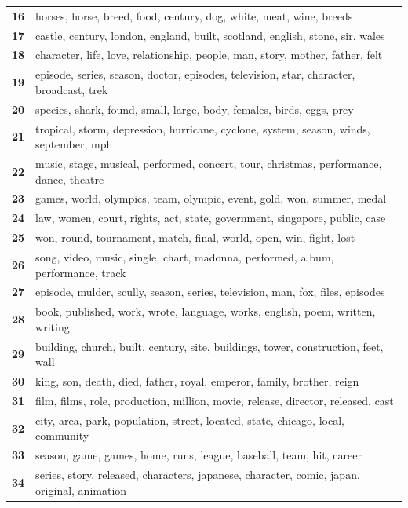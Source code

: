 \begin{table}[htpb]
\begin{tabularx}{\textwidth}{@{}l X@{}}
        \textbf{16} & horses, horse, breed, food, century, dog, white, meat, wine, breeds \\
        \textbf{17} & castle, century, london, england, built, scotland, english, stone, sir, wales \\
        \textbf{18} & character, life, love, relationship, people, man, story, mother, father, felt \\
        \textbf{19} & episode, series, season, doctor, episodes, television, star, character, broadcast, trek \\
        \textbf{20} & species, shark, found, small, large, body, females, birds, eggs, prey \\
        \textbf{21} & tropical, storm, depression, hurricane, cyclone, system, season, winds, september, mph \\
        \textbf{22} & music, stage, musical, performed, concert, tour, christmas, performance, dance, theatre \\
        \textbf{23} & games, world, olympics, team, olympic, event, gold, won, summer, medal \\
        \textbf{24} & law, women, court, rights, act, state, government, singapore, public, case \\
        \textbf{25} & won, round, tournament, match, final, world, open, win, fight, lost \\
        \textbf{26} & song, video, music, single, chart, madonna, performed, album, performance, track \\
        \textbf{27} & episode, mulder, scully, season, series, television, man, fox, files, episodes \\
        \textbf{28} & book, published, work, wrote, language, works, english, poem, written, writing \\
        \textbf{29} & building, church, built, century, site, buildings, tower, construction, feet, wall \\
        \textbf{30} & king, son, death, died, father, royal, emperor, family, brother, reign \\
        \textbf{31} & film, films, role, production, million, movie, release, director, released, cast \\
        \textbf{32} & city, area, park, population, street, located, state, chicago, local, community \\
        \textbf{33} & season, game, games, home, runs, league, baseball, team, hit, career \\
        \textbf{34} & series, story, released, characters, japanese, character, comic, japan, original, animation \\

\end{tabularx}
\end{table}
